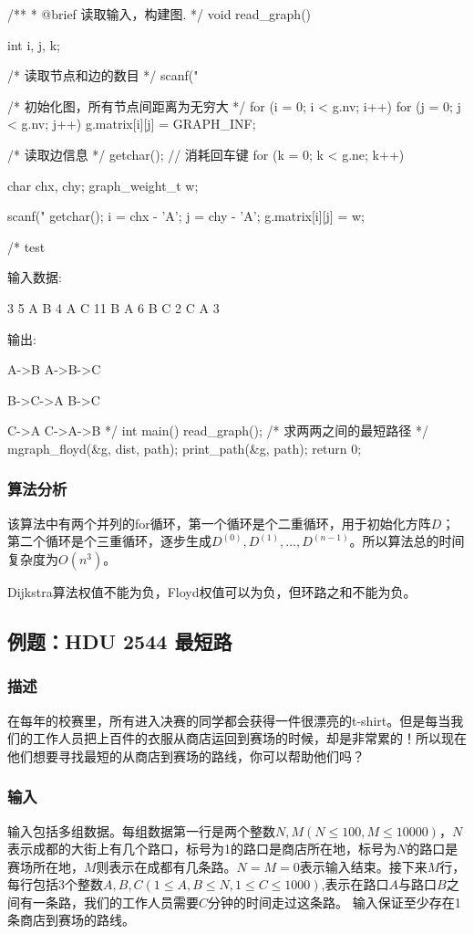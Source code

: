 \begin{Codex}[label=mgraph_floyd.c]
/**
 * @brief 读取输入，构建图.
 */
void read_graph() {
    int i, j, k;

    /* 读取节点和边的数目 */
    scanf("%

    /* 初始化图，所有节点间距离为无穷大 */
    for (i = 0; i < g.nv; i++) {
        for (j = 0; j < g.nv; j++) {
            g.matrix[i][j] = GRAPH_INF;
        }
    }

    /* 读取边信息 */
    getchar(); // 消耗回车键
    for (k = 0; k < g.ne; k++) {
        char chx, chy;
        graph_weight_t w;

        scanf("%
        getchar();
        i = chx - 'A';
        j = chy - 'A';
        g.matrix[i][j] = w;
    }
}

/* test

输入数据:

3 5
A B 4
A C 11
B A 6
B C 2
C A 3

输出:

A->B
A->B->C

B->C->A
B->C

C->A
C->A->B
*/
int main() {
    read_graph();
    /* 求两两之间的最短路径 */
    mgraph_floyd(&g, dist, path);
    print_path(&g, path);
    return 0;
}
\end{Codex}

\subsubsection{算法分析}
该算法中有两个并列的for循环，第一个循环是个二重循环，用于初始化方阵$D$；第二个循环是个三重循环，逐步生成$D^{(0)}, D^{(1)} ,...,D^{(n-1)}$。所以算法总的时间复杂度为$O(n^3)$。

Dijkstra算法权值不能为负，Floyd权值可以为负，但环路之和不能为负。


\subsection{例题：HDU 2544 最短路}
\subsubsection{描述}
在每年的校赛里，所有进入决赛的同学都会获得一件很漂亮的t-shirt。但是每当我们的工作人员把上百件的衣服从商店运回到赛场的时候，却是非常累的！所以现在他们想要寻找最短的从商店到赛场的路线，你可以帮助他们吗？

\subsubsection{输入}
输入包括多组数据。每组数据第一行是两个整数$N,M(N \leq 100,M \leq 10000)$，$N$表示成都的大街上有几个路口，标号为1的路口是商店所在地，标号为$N$的路口是赛场所在地，$M$则表示在成都有几条路。$N=M=0$表示输入结束。接下来$M$行，每行包括3个整数$A,B,C(1 \leq A,B \leq N,1 \leq C \leq 1000)$,表示在路口$A$与路口$B$之间有一条路，我们的工作人员需要$C$分钟的时间走过这条路。
输入保证至少存在1条商店到赛场的路线。

